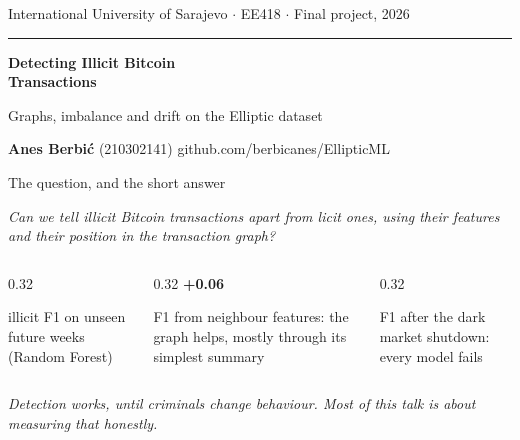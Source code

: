 \documentclass[aspectratio=169,11pt]{beamer}
\newcommand{\takeaway}[1]{%
  \par\vspace{0.25cm}{\color{accent}\rule[0.2ex]{0.5cm}{2pt}}\hspace{0.25cm}%
  \begin{minipage}[t]{0.9\linewidth}\rmfamily\itshape #1\end{minipage}}
\newcommand{\stat}[2]{{\rmfamily\bfseries\Huge\color{#1}#2}}
\begin{document}
{
\begin{frame}[plain]
  \vspace*{0.6cm}
  {\small\color{muted}International University of Sarajevo $\cdot$ EE418 $\cdot$ Final project, 2026}

  \vspace{1.6cm}
  {\color{accent}\rule{1cm}{2.5pt}}\par\vspace{0.3cm}
  {\rmfamily\bfseries\fontsize{34}{38}\selectfont Detecting Illicit Bitcoin\\[0.1cm]Transactions\par}
  \vspace{0.35cm}
  {\large\color{ink!80}Graphs, imbalance and drift on the Elliptic dataset\par}

  \vspace{1.4cm}
  {\small\textbf{Anes Berbi\'c} (210302141)\hfill
   {\color{muted}github.com/berbicanes/EllipticML}}
\end{frame}
}

\begin{frame}{The question, and the short answer}
  {\rmfamily\itshape\Large Can we tell illicit Bitcoin transactions apart from licit ones,
  using their features and their position in the transaction graph?\par}
  \vspace{0.6cm}
  \begin{columns}[T]
    \begin{column}{0.32\textwidth}
      \stat{accent}{\MainRFFone}\par\vspace{0.1cm}
      \small illicit F1 on unseen future weeks (Random Forest)
    \end{column}
    \begin{column}{0.32\textwidth}
      \stat{accent}{+0.06}\par\vspace{0.1cm}
      \small F1 from neighbour features: the graph helps, mostly through its simplest summary
    \end{column}
    \begin{column}{0.32\textwidth}
      \stat{illicit}{\DriftRFPost}\par\vspace{0.1cm}
      \small F1 after the dark market shutdown: every model fails
    \end{column}
  \end{columns}
  \takeaway{Detection works, until criminals change behaviour. Most of this talk is
  about measuring that honestly.}
\end{frame}
\end{document}
